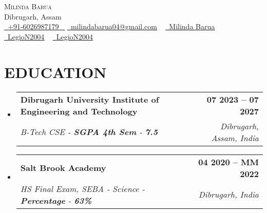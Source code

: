 \documentclass[letterpaper,11pt]{article}
\makeatletter
\newcommand{\resumeSubheading}[4]{
				\vspace{-2pt}\item
				\begin{tabular*}{1.0\textwidth}[t]{l@{\extracolsep{\fill}}r}
						\textbf{\large#1} & \textbf{\small #2} \\
						\textit{\large#3} & \textit{\small #4} \\

				\end{tabular*}\vspace{-7pt}
		}
\newcommand{\resumeSubHeadingListStart}{\begin{itemize}[leftmargin=0.0in, label={}]}
\newcommand{\resumeSubHeadingListEnd}{\end{itemize}}
\makeatother
\begin{document}




\begin{center}
	{\Huge \scshape Milinda Barua} \\ \vspace{1pt}
	Dibrugarh, Assam \\ \vspace{1pt}
	\small \href{tel:+xxxxxxxxxxxx}{ \raisebox{-0.1\height}\faPhone\ \underline{+91-6026987179} ~} \href{mailto:milindabarua04@gmail.com}{\raisebox{-0.2\height}\faEnvelope\  \underline{milindabarua04@gmail.com}} ~
	\href{https://linkedin.com/in/milinda-barua}{\raisebox{-0.2\height}\faLinkedinSquare\ \underline{Milinda Barua}}  ~
	\href{https://github.com/LegioN2004}{\raisebox{-0.2\height}\faGithub\ \underline{LegioN2004}} ~
	\href{https://leetcode.com/u/LegioN2004/}
	{\raisebox{-0.2\height}\faPoll\ \underline{LegioN2004}} ~
	\vspace{-8pt}
\end{center}




\section{EDUCATION}
\resumeSubHeadingListStart
\resumeSubheading
{Dibrugarh University Institute of Engineering and Technology}{07 2023 -- 07 2027}
{B-Tech CSE - \textbf{SGPA 4th Sem} - \textbf{7.5}}{Dibrugarh, Assam, India}
\resumeSubHeadingListEnd

\resumeSubHeadingListStart
\resumeSubheading
{Salt Brook Academy}{04 2020 -- MM 2022}
{HS Final Exam, SEBA - Science  - \textbf{Percentage} - \textbf{63\%}}{Dibrugarh, India}
\resumeSubHeadingListEnd


\end{document}
